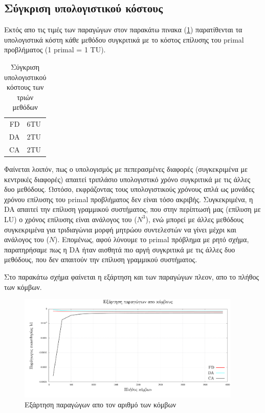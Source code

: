 \subsection{Σύγκριση υπολογιστικού κόστους} 

Εκτός απο τις τιμές των παραγώγων στον παρακάτω πινακα (\ref{tab:cost}) παρατίθενται τα υπολογιστικά κόστη κάθε μεθόδου συγκριτικά με το κόστος επίλυσης του primal προβλήματος (1 primal = 1 TU).

   \begin{table}[h!]
    \begin{center}
        \begin{tabular}[c]{|r|l|}
            \hline
           FD & 6TU\\ 
           DA & 2TU\\ 
           CA & 2TU\\ 
            \hline
        \end{tabular}
    \caption{Σύγκριση υπολογιστικού κόστους των τριών μεθόδων}
    \label{tab:cost}
    \end{center}
   \end{table}
    
    
Φαίνεται λοιπόν, πως ο υπολογισμός με πεπερασμένες διαφορές (συγκεκριμένα με κεντρικές διαφορές) απαιτεί τριπλάσιο υπολογιστικό χρόνο συγκριτικά με τις άλλες δυο μεθόδους. Ωστόσο, εκφράζοντας τους υπολογιστικούς χρόνους απλά ως μονάδες χρόνου επίλυσης του primal προβλήματος δεν είναι τόσο ακριβής. Συγκεκριμένα, η DA απαιτεί την επίλυση γραμμικού συστήματος, που στην περίπτωσή μας (επίλυση με LU) ο χρόνος επίλυσης είναι ανάλογος του ($N^3$), ενώ μπορεί με άλλες μεθόδους συγκεκριμένα για τριδιαγώνια μορφή μητρώου συντελεστών να γίνει μέχρι και ανάλογος του ($N$). Επομένως, αφού λύνουμε το primal πρόβλημα με ρητό σχήμα, παρατηρήσαμε πως η DA ήταν αισθητά πιο αργή συγκριτικά με τις άλλες δυο μεθόδους, που δεν απαιτούν την επίλυση γραμμικού συστήματος. 

Στο παρακάτω σχήμα φαίνεται η εξάρτηση και των παραγώγων πλεον, απο το πλήθος των κόμβων. 

\begin{figure}[h!]
    \begin{center}
        \includegraphics[width=0.95\textwidth]{figures/ders_vs_nodes.pdf}
    \end{center}
    \caption{Εξάρτηση παραγώγων απο τον αριθμό των κόμβων}
    \label{fig:der_vs_nodes}
\end{figure}

